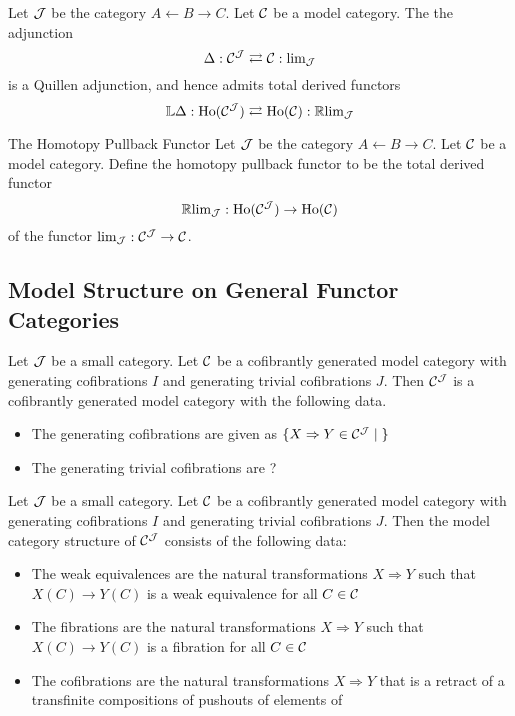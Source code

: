 \documentclass[a4paper]{article}
\begin{document}
\begin{prp}{}{} Let $\mathcal{J}$ be the category $A\leftarrow B\rightarrow C$. Let $\mathcal{C}$ be a model category. The the adjunction $$\Delta:\mathcal{C}^{\mathcal{J}}\rightleftarrows\mathcal{C}:\text{lim}_{\mathcal{J}}$$ is a Quillen adjunction, and hence admits total derived functors $$\mathbb{L}\Delta:\text{Ho}(\mathcal{C}^{\mathcal{J}})\rightleftarrows\text{Ho}(\mathcal{C}):\mathbb{R}\text{lim}_{\mathcal{J}}$$
\end{prp}

\begin{defn}{The Homotopy Pullback Functor}{} Let $\mathcal{J}$ be the category $A\leftarrow B\rightarrow C$. Let $\mathcal{C}$ be a model category. Define the homotopy pullback functor to be the total derived functor $$\mathbb{R}\text{lim}_{\mathcal{J}}:\text{Ho}(\mathcal{C}^{\mathcal{J}})\to\text{Ho}(\mathcal{C})$$ of the functor $\text{lim}_{\mathcal{J}}:\mathcal{C}^{\mathcal{J}}\to\mathcal{C}$. 
\end{defn}


\subsection{Model Structure on General Functor Categories}
\begin{thm}{}{} Let $\mathcal{J}$ be a small category. Let $\mathcal{C}$ be a cofibrantly generated model category with generating cofibrations $I$ and generating trivial cofibrations $J$. Then $\mathcal{C}^{\mathcal{J}}$ is a cofibrantly generated model category with the following data. 
\begin{itemize}
\item The generating cofibrations are given as $\{X\Rightarrow Y\in\mathcal{C}^{\mathcal{J}}\;|\;\}$
\item The generating trivial cofibrations are ?
\end{itemize}
\end{thm}

\begin{prp}{}{} Let $\mathcal{J}$ be a small category. Let $\mathcal{C}$ be a cofibrantly generated model category with generating cofibrations $I$ and generating trivial cofibrations $J$. Then the model category structure of $\mathcal{C}^{\mathcal{J}}$ consists of the following data: 
\begin{itemize}
\item The weak equivalences are the natural transformations $X\Rightarrow Y$ such that $X(C)\to Y(C)$ is a weak equivalence for all $C\in\mathcal{C}$
\item The fibrations are the natural transformations $X\Rightarrow Y$ such that $X(C)\to Y(C)$ is a fibration for all $C\in\mathcal{C}$
\item The cofibrations are the natural transformations $X\Rightarrow Y$ that is a retract of a transfinite compositions of pushouts of elements of 
\end{itemize}
\end{prp}
\end{document}
